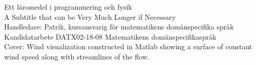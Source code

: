 \newpage
\thispagestyle{plain}
\vspace*{4.5cm}
Ett läromedel i programmering och fysik\\
A Subtitle that can be Very Much Longer if Necessary\\

Handledare: Patrik, kursansvarig för matematikens domänspecifika språk\\

Kandidatarbete DATX02-18-08 Matematikens domänspecifikaspråk\\	%

\vfill
Cover: Wind visualization constructed in Matlab showing a surface of constant wind speed along with streamlines of the flow. \setlength{\parskip}{0.5cm}

